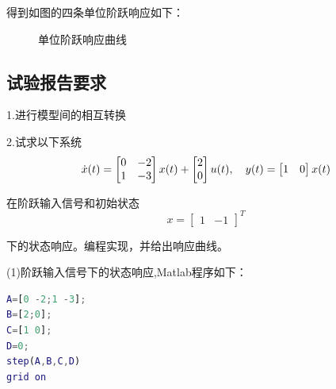 \documentclass[UTF8]{ctexart}
\begin{document}
\par 得到如图的四条单位阶跃响应如下：
\newpage
\par \begin{figure}      
 \caption{\label{1} 单位阶跃响应曲线} 
 \end{figure}
 
 \subsection{ 试验报告要求}
 \par 1.进行模型间的相互转换
 \par 2.试求以下系统
 \begin{equation}
    \dot x(t)\\=\begin{bmatrix}
    0 & -2 \\
    1 & -3 \\ \end{bmatrix}x(t)+ \begin{bmatrix}
    2\\
    0\\
    \end{bmatrix}u(t) ,  \quad      y(t)=\begin{bmatrix}
    1 & 0 \\\end{bmatrix}x(t) 
\end{equation}

 在阶跃输入信号和初始状态\[ x= \begin{bmatrix}1 & -1\end{bmatrix}^{T}\] \par 下的状态响应。编程实现，并给出响应曲线。

\par (1)阶跃输入信号下的状态响应,Matlab程序如下：
\par  \begin{lstlisting}[language=matlab,escapeinside=``]
A=[0 -2;1 -3];
B=[2;0];
C=[1 0];
D=0;
step(A,B,C,D)
grid on
\end{lstlisting}
\end{document}
